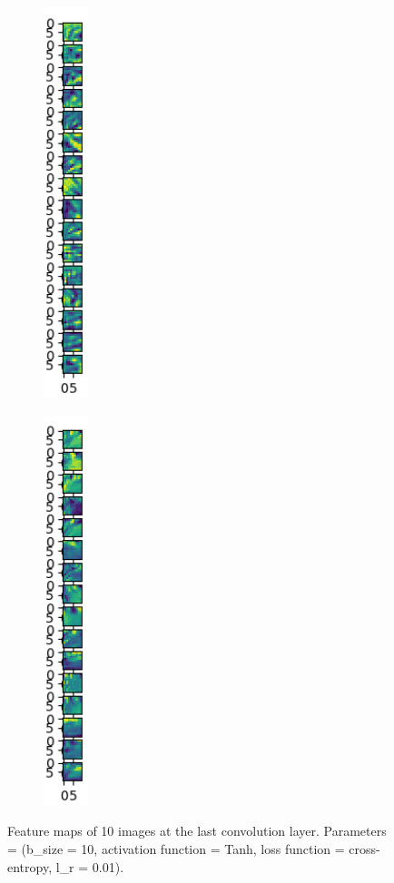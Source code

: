 \documentclass[12pt]{article}
\begin{document}
\begin{figure}[h]
{\begin{subfigure}{1.3cm}
					\captionsetup{justification=centering,margin=.6cm}
				\end{subfigure}%
				\begin{subfigure}{1.3cm}
					\centering
					\includegraphics[width=1.3cm]{../Images/Feature_Maps_Cropped/image_8.png}
					\captionsetup{justification=centering,margin=1cm}
					\label{fig:sub5}
				\end{subfigure}%
				\begin{subfigure}{1.3cm}
					\centering
					\includegraphics[width=1.3cm]{../Images/Feature_Maps_Cropped/image_9.png}
					\captionsetup{justification=centering,margin=0.4cm}
				\end{subfigure}	
				}
				\captionsetup{justification=centering,margin=1cm}
				\caption{Feature maps of 10 images at the last convolution layer. Parameters = (b\_size = 10, activation function = Tanh, loss function = cross-entropy, l\_r = 0.01).}
				\label{fig_3}
			\end{figure}
		
\end{document}
